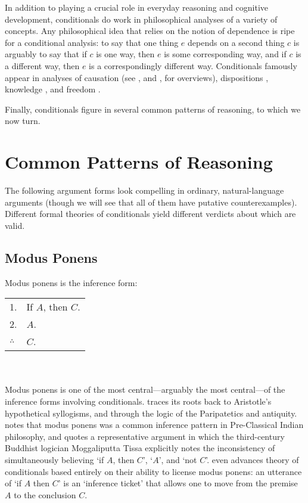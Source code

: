 In addition to playing a crucial role in everyday reasoning and cognitive development, conditionals do work in philosophical analyses of a variety of concepts.  Any philosophical idea that relies on the notion of dependence is ripe for a conditional analysis: to say that one thing $e$ depends on a second thing $c$ is arguably to say that if $c$ is one way, then $e$ is some corresponding way, and if $c$ is a different way, then $e$ is a correspondingly different way.  Conditionals famously appear in analyses of causation (see \citealp{menzies-sep}, and \citealp{Collins2004-COLCAC-2}, for overviews), dispositions \citep{prior-pargetter-jackson, choi-simple-reformed, choi-conditional-dispositions}, knowledge \citep{nozick-knowledge, sosa-moore}, and freedom \citep{moore-ethics, ayer-freedom}.

Finally, conditionals figure in several common patterns of reasoning, to which we now turn.

\section{Common Patterns of Reasoning}
\label{reasoning-patterns}

The following argument forms look compelling in ordinary, natural-language arguments (though we will see that all of them have putative counterexamples).  Different formal theories of conditionals yield different verdicts about which are valid.

\subsection{Modus Ponens}

Modus ponens is the inference form:\smallskip\\
\begin{tabular}{ll}
1. & If $A$, then $C$.\\
2. &$A$.\\
\hline
$\therefore$ & $C$.
\end{tabular}\\\smallskip\\
Modus ponens is one of the most central---arguably the most central---of the inference forms involving conditionals. \citet{Bobzien2002-BOBTDO-2} traces its roots back to Aristotle's hypothetical syllogisms, and through the logic of the Paripatetics and antiquity. \citet{sep-logic-india} notes that modus ponens was a common inference pattern in Pre-Classical Indian philosophy, and quotes a representative argument in which the third-century Buddhist logician Moggaliputta Tissa explicitly notes the inconsistency of simultaneously believing `if $A$, then $C$', `$A$', and `not $C$'.    \citet{ryle-ifsobecause} even advances theory of conditionals based entirely on their ability to license modus ponens: an utterance of `if $A$ then $C$' is an `inference ticket' that allows one to move from the premise $A$ to the conclusion $C$.

